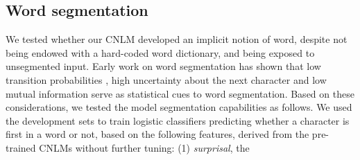 \subsection{Word segmentation}
\label{sec:segmentation}

We tested whether our CNLM developed an implicit notion of word, despite not being endowed with a hard-coded word dictionary, and being exposed to unsegmented input. %
Early work on word segmentation has shown that low transition
probabilities \cite{harris-distributional-1954, saffran-word-1996},
high uncertainty about the next character \cite{cohen-algorithm-2001,
  feng-accessor-2004} and low mutual information
\cite{sun-chinese-1998} serve as statistical cues to word
segmentation.  %
%
%
Based on these considerations, we tested the model segmentation
capabilities as follows. We used the development sets to
train  logistic classifiers predicting whether a character is first in
a word or not, based on the following features, derived from the
pre-trained CNLMs without further tuning: (1) \emph{surprisal}, the
